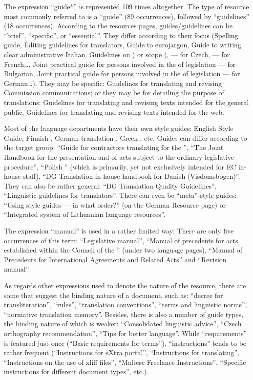 \documentclass[output=paper]{langsci/langscibook}
\begin{document}
The expression “guide*” is represented 109 times altogether. The type of resource most commonly referred to is a “guide” (89 occurrences), followed by “guidelines” (18 occurrences). According to the  resources pages, guides/guidelines can be “brief”, “specific”, or “essential”. They differ according to their focus (Spelling guide, Editing guidelines for translators, Guide to eurojargon, Guide to writing clear administrative Italian, Guidelines on ) or scope (,  — for Czech,  — for French…, Joint practical guide for persons involved in the  of  legislation — for Bulgarian, Joint practical guide for persons involved in the  of  legislation — for German…). They may be  specific: Guidelines for translating and revising Commission communications; or they may be for detailing the purpose of translations: Guidelines for translating and revising texts intended for the general public, Guidelines for translating and revising texts intended for the web.

Most of the language departments have their own style guides: English Style Guide, Finnish , German translation , Greek , etc. Guides can differ according to the target group: “Guide for contractors translating for the ”, “The Joint Handbook for the presentation and  of acts subject to the ordinary legislative procedure”, “Polish ” (which is primarily, yet not exclusively intended for EC in-house staff), “DG Translation in-house handbook for Danish (Visdomsbogen)”. They can also be rather general: “DG Translation Quality Guidelines”, “Linguistic guidelines for translators”. There can even be “meta”-style guides: “Using style guides — in what order?” (on the German Resource page) or “Integrated system of Lithuanian language resources”.

The expression “manual” is used in a rather limited way: There are only five occurrences of this term: “Legislative  manual”, “Manual of precedents for acts established within the Council of the ” (under two language pages), “Manual of Precedents for International Agreements and Related Acts” and “Revision manual”. 

As regards other expressions used to denote the nature of the resource, there are some that suggest the binding nature of a document, such as: 
“decree for trans\-literation”, 
“rules”, 
“translation conventions”,
“terms and linguistic norms”, 
“normative translation memory”.
Besides, there is also a number of guide types, the binding nature of which is weaker: “Consolidated linguistic advice”, “Czech orthography recommendation”, “Tips for better language”. While “requirements” is featured just once (“Basic requirements for terms”), “instructions” tends to be rather frequent (“Instructions for eXtra portal”, “Instructions for translating”, “Instructions on the use of xliff files”, “Maltese Freelance Instructions”, “Specific instructions for different document types”, etc.).
\end{document}
